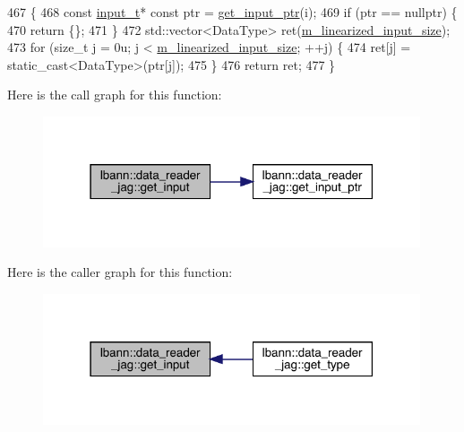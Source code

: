 \begin{DoxyCode}
467                                                                    \{
468   \textcolor{keyword}{const} \hyperlink{classlbann_1_1data__reader__jag_ab08c9af4bca496b7889de1473c3d8d4e}{input\_t}* \textcolor{keyword}{const} ptr = \hyperlink{classlbann_1_1data__reader__jag_a5535a2dc025d484ac01a6aad8585c9b5}{get\_input\_ptr}(i);
469   \textcolor{keywordflow}{if} (ptr == \textcolor{keyword}{nullptr}) \{
470     \textcolor{keywordflow}{return} \{\};
471   \}
472   std::vector<DataType> ret(\hyperlink{classlbann_1_1data__reader__jag_a75e3c8870f9fc8e50fb24e4515ac7d82}{m\_linearized\_input\_size});
473   \textcolor{keywordflow}{for} (\textcolor{keywordtype}{size\_t} j = 0u; j < \hyperlink{classlbann_1_1data__reader__jag_a75e3c8870f9fc8e50fb24e4515ac7d82}{m\_linearized\_input\_size}; ++j) \{
474     ret[j] = \textcolor{keyword}{static\_cast<}DataType\textcolor{keyword}{>}(ptr[j]);
475   \}
476   \textcolor{keywordflow}{return} ret;
477 \}
\end{DoxyCode}
Here is the call graph for this function\+:\nopagebreak
\begin{figure}[H]
\begin{center}
\leavevmode
\includegraphics[width=316pt]{classlbann_1_1data__reader__jag_aef236213fa1b229a2554c494fabb8873_cgraph}
\end{center}
\end{figure}
Here is the caller graph for this function\+:\nopagebreak
\begin{figure}[H]
\begin{center}
\leavevmode
\includegraphics[width=316pt]{classlbann_1_1data__reader__jag_aef236213fa1b229a2554c494fabb8873_icgraph}
\end{center}
\end{figure}
\mbox{\label{classlbann_1_1data__reader__jag_a5535a2dc025d484ac01a6aad8585c9b5}} 
